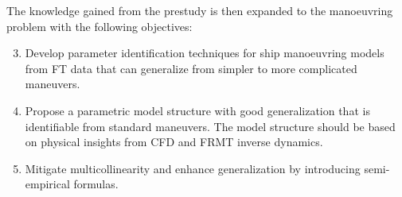 \vspace{0.1 cm}
\noindent The knowledge gained from the prestudy is then expanded to the manoeuvring problem with the following objectives: 
\begin{enumerate}[label=(\Alph*),itemsep=1mm]
    \setcounter{enumi}{2}

    \item Develop parameter identification techniques for ship manoeuvring models from FT data that can generalize from simpler to more complicated maneuvers.

    \item Propose a parametric model structure with good generalization that is identifiable from standard maneuvers. The model structure should be based on physical insights from CFD and FRMT inverse dynamics.

    \item Mitigate multicollinearity and enhance generalization by introducing semi-empirical formulas.
    
\end{enumerate}
